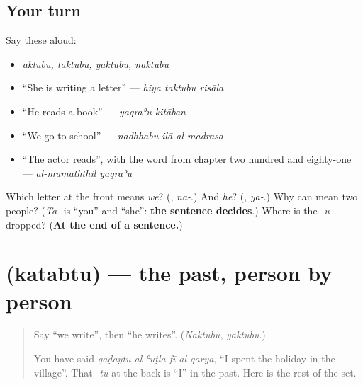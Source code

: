 \subsection*{Your turn}
Say these aloud:

\begin{itemize}
\raggedright
  \item \emph{aktubu, taktubu, yaktubu, naktubu}
  \item \textquotedblleft{}She is writing a letter\textquotedblright{} — \emph{hiya taktubu risāla}
  \item \textquotedblleft{}He reads a book\textquotedblright{} — \emph{yaqraʾu kitāban}
  \item \textquotedblleft{}We go to school\textquotedblright{} — \emph{nadhhabu ilā al-madrasa}
  \item \textquotedblleft{}The actor reads\textquotedblright{}, with the word from chapter two hundred and eighty-one — \emph{al-mumaththil yaqraʾu}
\end{itemize}

\begin{tcolorbox}[breakable,colback=teal!4,colframe=teal!35!black,title={Before you move on}]
Which letter at the front means \emph{we}? (\textbf{}, \emph{na-}.) And \emph{he}? (\textbf{}, \emph{ya-}.) Why can \textbf{} mean two people? (\emph{Ta-} is \textquotedblleft{}you\textquotedblright{} and \textquotedblleft{}she\textquotedblright{}: \textbf{the sentence decides}.) Where is the \emph{-u} dropped? (\textbf{At the end of a sentence.})
\end{tcolorbox}
\section[\texorpdfstring{\ar{كتبت} (katabtu)}{كتبت (katabtu)}]{ (katabtu) — the past, person by person}

\label{lesson:AR-C283-katabtu}



\begin{quote}
Say \textquotedblleft{}we write\textquotedblright{}, then \textquotedblleft{}he writes\textquotedblright{}. (\emph{Naktubu}, \emph{yaktubu}.)

You have said \emph{qaḍaytu al-ʿuṭla fī al-qarya}, \textquotedblleft{}I spent the holiday in the village\textquotedblright{}. That \emph{-tu} at the back is \textquotedblleft{}I\textquotedblright{} in the past. Here is the rest of the set.
\end{quote}

